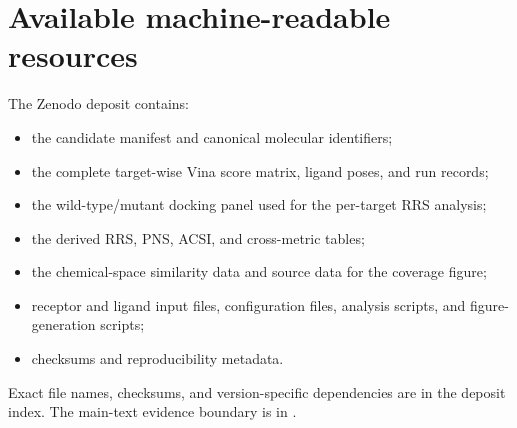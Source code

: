 \documentclass[journal=jcisd8,manuscript=suppinfo]{achemso}
\begin{document}
\section{Available machine-readable resources}\label{sec:sm_resources}
The Zenodo deposit contains:
\begin{itemize}
    \item the candidate manifest and canonical molecular identifiers;
    \item the complete target-wise Vina score matrix, ligand poses, and run records;
    \item the wild-type/mutant docking panel used for the per-target RRS analysis;
    \item the derived RRS, PNS, ACSI, and cross-metric tables;
    \item the chemical-space similarity data and source data for the coverage figure;
    \item receptor and ligand input files, configuration files, analysis scripts, and figure-generation scripts;
    \item checksums and reproducibility metadata.
\end{itemize}
Exact file names, checksums, and version-specific dependencies are in the deposit index. The main-text evidence boundary is in .


\end{document}
